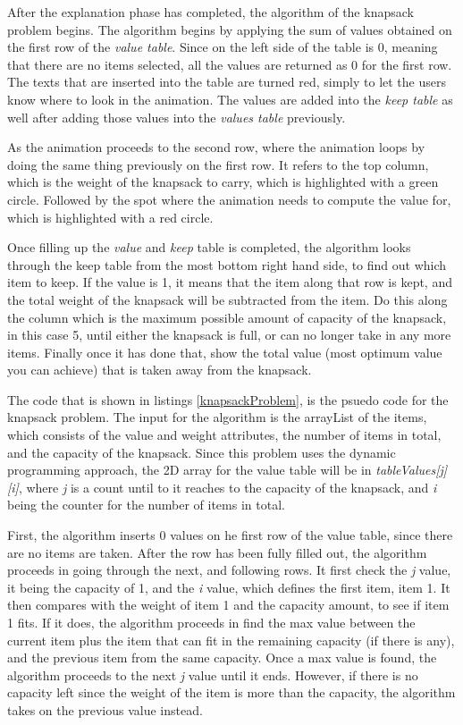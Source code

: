 After the explanation phase has completed, the algorithm of the knapsack problem begins. The algorithm begins by applying the sum of values obtained on the first row of the \textit{value table}. Since on the left side of the table is 0, meaning that there are no items selected, all the values are returned as 0 for the first row. The texts that are inserted into the table are turned red, simply to let the users know where to look in the animation. The values are added into the \textit{keep table} as well after adding those values into the \textit{values table} previously.

As the animation proceeds to the second row, where the animation loops by doing the same thing previously on the first row. It refers to the top column, which is the weight of the knapsack to carry, which is highlighted with a green circle. Followed by the spot where the animation needs to compute the value for, which is highlighted with a red circle. 

Once filling up the \textit{value} and \textit{keep} table is completed, the algorithm looks through the keep table from the most bottom right hand side, to find out which item to keep. If the value is 1, it means that the item along that row is kept, and the total weight of the knapsack will be subtracted from the item. Do this along the column which is the maximum possible amount of capacity of the knapsack, in this case 5, until either the knapsack is full, or can no longer take in any more items. Finally once it has done that, show the total value (most optimum value you can achieve) that is taken away from the knapsack.



The code that is shown in listings \ref{knapsackProblem}, is the psuedo code for the knapsack problem\cite{}. The input for the algorithm is the arrayList of the items, which consists of the value and weight attributes, the number of items in total, and the capacity of the knapsack. Since this problem uses the dynamic programming approach, the 2D array for the value table will be in \textit{tableValues[j][i]}, where \textit{j} is a count until to it reaches to the capacity of the knapsack, and \textit{i} being the counter for the number of items in total. 

First, the algorithm inserts 0 values on he first row of the value table, since there are no items are taken. After the row has been fully filled out, the algorithm proceeds in going through the next, and following rows. It first check the \textit{j} value, it being the capacity of 1, and the \textit{i} value, which defines the first item, item 1. It then compares with the weight of item 1 and the capacity amount, to see if item 1 fits. If it does, the algorithm proceeds in find the max value between the current item plus the item that can fit in the remaining capacity (if there is any), and the previous item from the same capacity. Once a max value is found, the algorithm proceeds to the next \textit{j} value until it ends. However, if there is no capacity left since the weight of the item is more than the capacity, the algorithm takes on the previous value instead.

